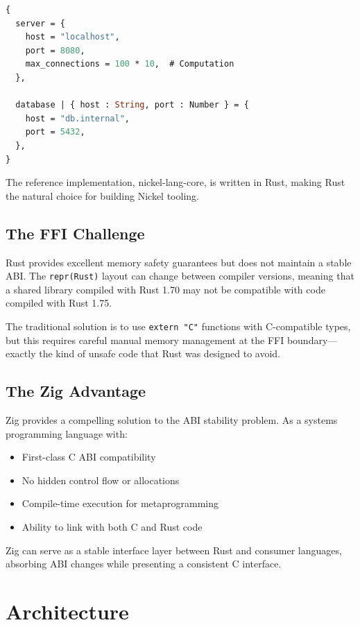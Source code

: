 \documentclass[11pt,a4paper]{article}
\begin{document}
\begin{lstlisting}[language=ML,caption={Example Nickel configuration}]
{
  server = {
    host = "localhost",
    port = 8080,
    max_connections = 100 * 10,  # Computation
  },

  database | { host : String, port : Number } = {
    host = "db.internal",
    port = 5432,
  },
}
\end{lstlisting}

The reference implementation, nickel-lang-core, is written in Rust, making Rust the natural choice for building Nickel tooling.

\subsection{The FFI Challenge}

Rust provides excellent memory safety guarantees but does not maintain a stable ABI. The \texttt{repr(Rust)} layout can change between compiler versions, meaning that a shared library compiled with Rust 1.70 may not be compatible with code compiled with Rust 1.75.

The traditional solution is to use \texttt{extern "C"} functions with C-compatible types, but this requires careful manual memory management at the FFI boundary---exactly the kind of unsafe code that Rust was designed to avoid.

\subsection{The Zig Advantage}

Zig provides a compelling solution to the ABI stability problem. As a systems programming language with:

\begin{itemize}
    \item First-class C ABI compatibility
    \item No hidden control flow or allocations
    \item Compile-time execution for metaprogramming
    \item Ability to link with both C and Rust code
\end{itemize}

Zig can serve as a stable interface layer between Rust and consumer languages, absorbing ABI changes while presenting a consistent C interface.

\section{Architecture}
\end{document}
